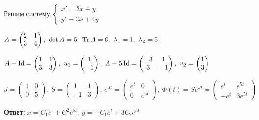 \documentclass[12pt]{article}
\begin{document}
\begin{Example}{}
    Решим систему $\begin{cases}
        x' = 2x + y \\
        y' = 3x + 4y
    \end{cases}$

    $A = \begin{pmatrix}
        2 & 1 \\
        3 & 4
    \end{pmatrix},\ \det A = 5,\ \operatorname{Tr} A = 6,\ \lambda_1 = 1,\ \lambda_2 = 5$

    $A - \operatorname{Id} = \begin{pmatrix}
        1 & 1 \\
        3 & 3
    \end{pmatrix},\ u_1 = \begin{pmatrix}
        1 \\
        -1
    \end{pmatrix};\ A - 5\operatorname{Id} = \begin{pmatrix}
        -3 & 1 \\
        3 & -1
    \end{pmatrix},\ u_2 = \begin{pmatrix}
        1 \\
        3
    \end{pmatrix}$

    $J = \begin{pmatrix}
        1 & 0 \\
        0 & 5
    \end{pmatrix},\ S = \begin{pmatrix}
        1 & 1 \\
        -1 & 3
    \end{pmatrix};\ e^{Jt} = \begin{pmatrix}
        e^t & 0 \\
        0 & e^{5t}
    \end{pmatrix},\ \Phi(t) = Se^{Jt} = \begin{pmatrix}
        e^t & e^{5t} \\
        -e^t & 3e^{5t}
    \end{pmatrix}$

    \textbf{Ответ:} $x = C_1e^t + C^2e^{5t},\ y = -C_1e^t + 3C_2e^{5t}$
\end{Example}
\end{document}
